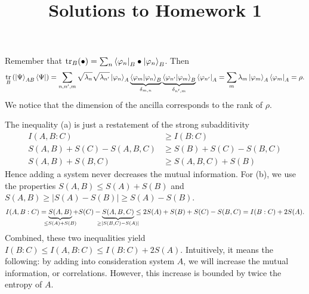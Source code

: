 \documentclass[a4paper,10pt,twoside]{article}
\DeclareMathOperator{\trace}{tr}
\begin{document}
\title{\vspace{-1cm}\sffamily Solutions to Homework 1\vspace{-1cm}}
\author{}
\date{}
\maketitle
\thispagestyle{fancy}

\begin{section}{}
Remember that $\trace_B (\bullet) = \sum_n \bra{\varphi_n}_B \bullet  \ket{\varphi_n}_B$. Then
\[
  \trace_B\left( \ket{\Psi}_{A B} \bra{\Psi}\right) 
  = \sum_{n,n^\prime,m} \sqrt{\lambda_n} \sqrt{\lambda_{n^\prime}} \ket{\varphi_n}_A \underbrace{\braket{\varphi_m | \varphi_n}_B}_{\delta_{m,n}} \underbrace{\braket{\varphi_{n^\prime} | \varphi_m}_B}_{\delta_{n^\prime,m}} \bra{\varphi_{n^\prime}}_A 
  = \sum_m \lambda_m \ket{\varphi_m}_A \bra{\varphi_m}_A
  = \rho .
\]
We notice that the dimension of the ancilla corresponds to the rank of $\rho$.
\end{section}

\begin{section}{}
The inequality (a) is just a restatement of the strong subadditivity
\begin{align*}
  I(A,B:C) &\geq I(B:C) \\
  S(A,B) + S(C) - S(A,B,C) &\geq S(B) + S(C) - S(B,C) \\
  S(A,B) + S(B,C) &\geq  S(A,B,C) + S(B)
\end{align*}
Hence adding a system never decreases the mutual information.
For (b), we use the properties  $S(A,B) \leq S(A) + S(B)$ and $S(A,B) \geq | S(A) - S(B) | \geq S(A) - S(B)$.
\begin{align*}
  I(A,B:C) = \underbrace{S(A,B)}_{\mathclap{\leq S(A) + S(B)}} + S(C) - \underbrace{S(A,B,C)}_{\mathclap{\geq |S(B,C) - S(A)|}} \leq 2S(A) + S(B) + S(C) - S(B,C) = I(B:C) + 2S(A).
\end{align*}
Combined, these two inequalities yield  $I(B:C) \leq I(A,B:C) \leq I(B:C) + 2S(A)$. 
Intuitively, it means the following: by adding into consideration system $A$, we will increase the mutual information, or correlations. However, this increase is bounded by twice the entropy of $A$. 
\end{section}
\end{document}
